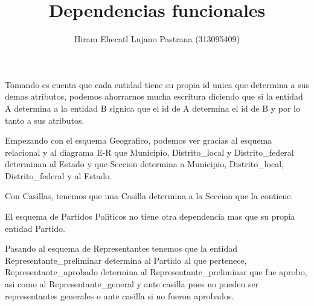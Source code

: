 \documentclass[a4paper,twoside,11pt]{article}
\title{Dependencias funcionales}
\author{Hiram Ehecatl Lujano Pastrana (313095409)}
\begin{document}
\maketitle

Tomando es cuenta que cada entidad tiene su propia id unica que
determina a sus demas atributos, podemos ahorrarnos mucha escritura
diciendo que si la entidad A determina a la entidad B signica que el
id de A determina el id de B y por lo tanto a sus atributos.

Empezando con el esquema Geografico, podemos ver gracias al esquema
relacional y al diagrama E-R que Municipio, Distrito\_local y
Distrito\_federal determinan al Estado y que Seccion determina a
Municipio, Distrito\_local, Distrito\_federal y al Estado.

Con Casillas, tenemos que una Casilla determina a la Seccion que la
contiene.

El esquema de Partidos Politicos no tiene otra dependencia mas que
su propia entidad Partido.

Pasando al esquema de Representantes tenemos que la entidad
Representante\_preliminar determina al Partido al que pertenece,
Representante\_aprobado determina al Representante\_preliminar que fue
aprobo, asi como al Representante\_general y ante casilla pues no pueden
ser representantes generales o ante casilla si no fueron aprobados.
\end{document}
